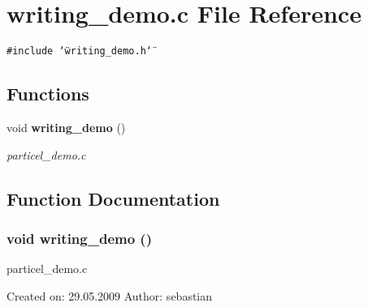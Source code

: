 \section{writing\_\-demo.c File Reference}
\label{writing__demo_8c}
{\tt \#include \char`\"{}writing\_\-demo.h\char`\"{}}\par
\subsection*{Functions}
\begin{CompactItemize}
\item 
void {\bf writing\_\-demo} ()
\begin{CompactList}\small\item\em particel\_\-demo.c \item\end{CompactList}\end{CompactItemize}


\subsection{Function Documentation}
\subsubsection{\setlength{\rightskip}{0pt plus 5cm}void writing\_\-demo ()}\label{writing__demo_8c_bdd925f1d9c8a09b9950c059c51e02d1}


particel\_\-demo.c 

Created on: 29.05.2009 Author: sebastian 